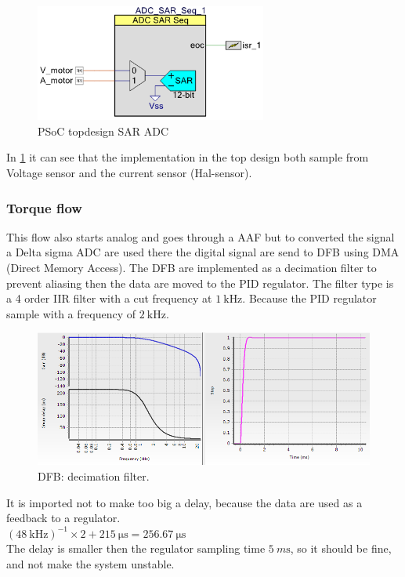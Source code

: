 \begin{figure}[H]
	\centering
	\includegraphics [width=3in]{Software/Pictures/ADC_Sar_topdesign.PNG}
	\caption{PSoC topdesign SAR ADC}
	\label{fig:ADC_SAR_topdesign}
\end{figure}

In \ref{fig:ADC_SAR_topdesign} it can see that the implementation in the top design both sample from Voltage sensor and the current sensor (Hal-sensor). 

\subsubsection{Torque flow}

This flow also starts analog and goes through a AAF but to converted the signal a Delta sigma ADC are used there the digital signal are send to DFB using DMA (Direct Memory Access). The DFB are implemented as a decimation filter to prevent aliasing then the data are moved to the PID regulator. The filter type is a 4 order IIR filter with a cut frequency at $ \SI{1}{\kilo\Hz} $. Because the PID regulator sample with a frequency of $ \SI{2}{\kilo\Hz} $.

\begin{figure}[H]
	\centering
	\includegraphics [width=6in]{Software/Pictures/DFB-decimation.PNG}
	\caption{DFB: decimation filter.}
	\label{fig:ADC_delsig_topdesign}
\end{figure}  

It is imported not to make too big a delay, because the data are used as a feedback to a regulator.\\
$ {(\SI{48}{\kilo\Hz})}^{-1}\times 2 + \SI{215}{\micro\s} = \SI{256.67}{\micro\s} $ \\
The delay is smaller then the regulator sampling time $ \SI{5}{m\s} $, so it should be fine, and not make the system unstable.  

